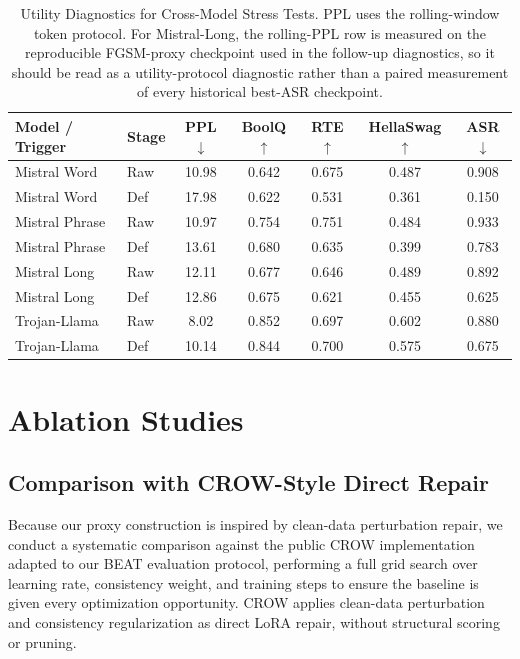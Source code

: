 \documentclass[lettersize,journal]{IEEEtran}
\begin{document}
\begin{table}[!t]
\caption{Utility Diagnostics for Cross-Model Stress Tests. PPL uses the rolling-window token protocol. For Mistral-Long, the rolling-PPL row is measured on the reproducible FGSM-proxy checkpoint used in the follow-up diagnostics, so it should be read as a utility-protocol diagnostic rather than a paired measurement of every historical best-ASR checkpoint.}
\label{tab:stress_utility}
\centering
\begin{tabular}{llccccc}
\toprule
Model / Trigger & Stage & PPL$\downarrow$ & BoolQ$\uparrow$ & RTE$\uparrow$ & HellaSwag$\uparrow$ & ASR$\downarrow$ \\
\midrule
Mistral Word & Raw & 10.98 & 0.642 & 0.675 & 0.487 & 0.908 \\
Mistral Word & Def & 17.98 & 0.622 & 0.531 & 0.361 & 0.150 \\
Mistral Phrase & Raw & 10.97 & 0.754 & 0.751 & 0.484 & 0.933 \\
Mistral Phrase & Def & 13.61 & 0.680 & 0.635 & 0.399 & 0.783 \\
Mistral Long & Raw & 12.11 & 0.677 & 0.646 & 0.489 & 0.892 \\
Mistral Long & Def & 12.86 & 0.675 & 0.621 & 0.455 & 0.625 \\
Trojan-Llama & Raw & 8.02 & 0.852 & 0.697 & 0.602 & 0.880 \\
Trojan-Llama & Def & 10.14 & 0.844 & 0.700 & 0.575 & 0.675 \\
\bottomrule
\end{tabular}
\end{table}

\section{Ablation Studies}

\subsection{Comparison with CROW-Style Direct Repair}
Because our proxy construction is inspired by clean-data perturbation repair, we conduct a systematic comparison against the public CROW implementation~\cite{crow} adapted to our BEAT evaluation protocol, performing a full grid search over learning rate, consistency weight, and training steps to ensure the baseline is given every optimization opportunity. CROW applies clean-data perturbation and consistency regularization as direct LoRA repair, without structural scoring or pruning.
\end{document}
